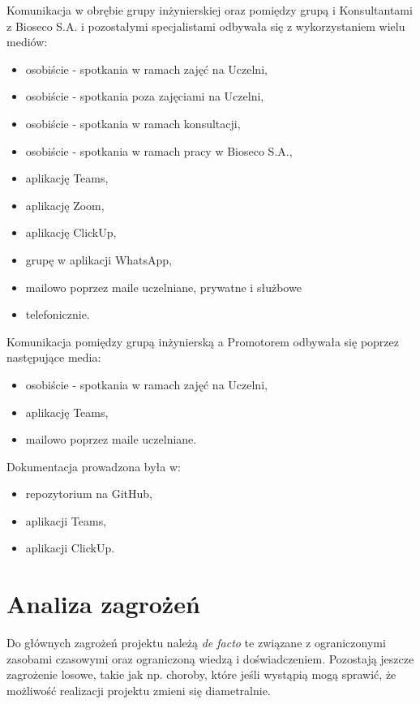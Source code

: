 \documentclass{sprz}
\begin{document}
Komunikacja w obrębie grupy inżynierskiej oraz pomiędzy grupą i Konsultantami z Bioseco S.A. i pozostałymi specjalistami odbywała się z wykorzystaniem wielu mediów:
\begin{itemize}
  \item{osobiście - spotkania w ramach zajęć na Uczelni,}
  \item{osobiście - spotkania poza zajęciami na Uczelni,}
  \item{osobiście - spotkania w ramach konsultacji,}
  \item{osobiście - spotkania w ramach pracy w Bioseco S.A.,}
  \item{aplikację Teams,}
  \item{aplikację Zoom,}
  \item{aplikację ClickUp,}
  \item{grupę w aplikacji WhatsApp,}
  \item{mailowo poprzez maile uczelniane, prywatne i służbowe}
  \item{telefonicznie.}
  \end{itemize}

Komunikacja pomiędzy grupą inżynierską a Promotorem odbywała się poprzez następujące media:
\begin{itemize}
  \item{osobiście - spotkania w ramach zajęć na Uczelni,}
  \item{aplikację Teams,}
  \item{mailowo poprzez maile uczelniane.}
  \end{itemize}

Dokumentacja prowadzona była w:
\begin{itemize}
  \item{repozytorium na GitHub,}
  \item{aplikacji Teams,}
  \item{aplikacji ClickUp.}
  \end{itemize}

\section{Analiza zagrożeń}

Do głównych zagrożeń projektu należą \textit{de facto} te związane z ograniczonymi zasobami czasowymi oraz ograniczoną wiedzą i doświadczeniem. Pozostają jeszcze zagrożenie losowe, takie jak np. choroby, które jeśli wystąpią mogą sprawić, że możliwość realizacji projektu zmieni się diametralnie.
\end{document}
